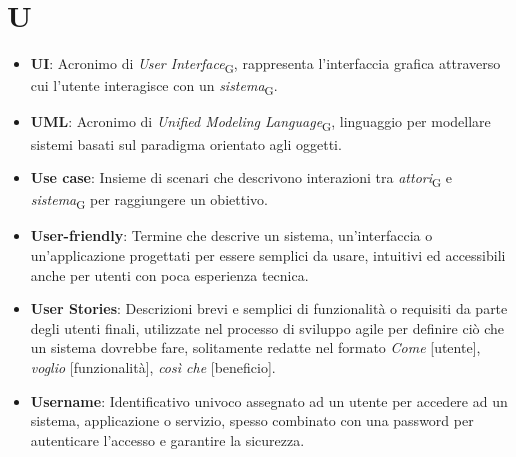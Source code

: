 \section*{U}  
\begin{itemize}
    \item \textbf{UI}: Acronimo di \textit{User Interface}\textsubscript{G}, rappresenta l'interfaccia grafica attraverso cui l'utente interagisce con un \textit{sistema}\textsubscript{G}.
    \item \textbf{UML}: Acronimo di \textit{Unified Modeling Language}\textsubscript{G}, linguaggio per modellare sistemi basati sul paradigma orientato agli oggetti.
    \item \textbf{Use case}: Insieme di scenari che descrivono interazioni tra \textit{attori}\textsubscript{G} e \textit{sistema}\textsubscript{G} per raggiungere un obiettivo.
    \item \textbf{User-friendly}: Termine che descrive un sistema, un'interfaccia o un'applicazione progettati per essere semplici da usare, intuitivi ed accessibili anche per utenti con poca esperienza tecnica.
    \item \textbf{User Stories}: Descrizioni brevi e semplici di funzionalità o requisiti da parte degli utenti finali, utilizzate nel processo di sviluppo agile per definire ciò che un sistema dovrebbe fare, solitamente redatte nel formato \textit{Come} [utente], \textit{voglio} [funzionalità], \textit{così che} [beneficio].
    \item \textbf{Username}: Identificativo univoco assegnato ad un utente per accedere ad un sistema, applicazione o servizio, spesso combinato con una password per autenticare l'accesso e garantire la sicurezza.
\end{itemize}
